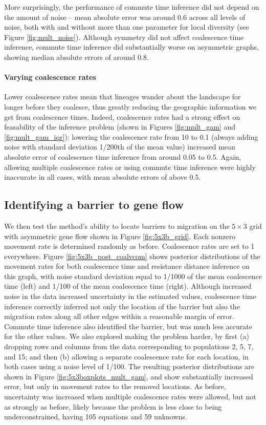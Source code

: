 \documentclass{article}
\begin{document}
More surprisingly, the performance of commute time inference did not depend on the amount of noise --
mean absolute error was around 0.6 across all levels of noise,
both with and without more than one parameter for local diversity
(see Figure \ref{fig:mult_noise}).
Although symmetry did not affect coalescence time inference,
commute time inference did substantially worse on asymmetric graphs,
showing median absolute errors of around 0.8.

\paragraph{Varying coalescence rates}
Lower coalescence rates mean that lineages wander about the landscape for longer
before they coalesce, 
thus greatly reducing the geographic information we get from coalescence times.
Indeed, coalescence rates had a strong effect on feasability of the inference problem
(shown in Figures \ref{fig:mult_gam} and \ref{fig:mult_gam_iqr}):
lowering the coalescence rate from 10 to 0.1
(always adding noise with standard deviation 1/200th of the mean value)
increased mean absolute error of coalescence time inference from around 0.05 to 0.5.
Again, allowing multiple coalescence rates
or using commute time inference were highly inaccurate in all cases,
with mean absolute errors of above 0.5.


\subsection*{Identifying a barrier to gene flow}
\label{sec:5x3b}


We then test the method's ability to locate barriers to migration
on the $5 \times 3$ grid with asymmetric gene flow shown in Figure \ref{fig:5x3b_grid}. 
Each nonzero movement rate is determined randomly as before.
Coalescence rates are set to 1 everywhere.
Figure \ref{fig:5x3b_post_coalvcom} shows posterior distributions of the movement rates
for both coalescence time and resistance distance inference
on this graph, with noise standard deviation equal to
1/1000 of the mean coalescence time (left)
and 1/100 of the mean coalescence time (right).
Although increased noise in the data increased uncertainty in the estimated values,
coalescence time inference correctly inferred not only the location of the barrier
but also the migration rates along all other edges within a reasonable margin of error.
Commute time inference also identified the barrier,
but was much less accurate for the other values.
We also explored making the problem harder,
by first (a) dropping rows and columns from the data corresponding to populations 2, 5, 7, and 15;
and then (b) allowing a separate coalescence rate for each location,
in both cases using a noise level of 1/100.
The resulting posterior distributions are shown in Figure \ref{fig:5x3boxplots_mult_gam},
and show substantially increased error,
but only in movement rates to the removed locations.
As before, uncertainty was increased when multiple coalescence rates were allowed,
but not as strongly as before, likely because the problem is less close to being underconstrained,
having 105 equations and 59 unknowns.
\end{document}
